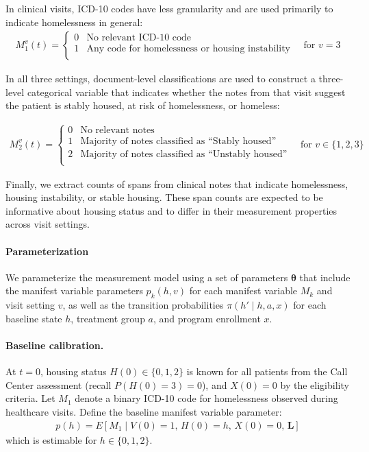 In clinical visits, ICD-10 codes have less granularity and are used primarily to indicate homelessness in general:
\begin{align*}
    M_1^v(t) = \begin{cases}
        0 & \text{No relevant ICD-10 code} \\
        1 & \text{Any code for homelessness or housing instability} \\
    \end{cases} \quad \text{for } v=3 
\end{align*}

In all three settings, document-level classifications are used to construct a three-level categorical variable that indicates whether the notes from that visit suggest the patient is stably housed, at risk of homelessness, or homeless:

\begin{align*}
    M_2^v(t) = \begin{cases}
        0 & \text{No relevant notes} \\
        1 & \text{Majority of notes classified as ``Stably housed''} \\
        2 & \text{Majority of notes classified as ``Unstably housed''} \\
    \end{cases} \quad \text{for } v \in \{1, 2, 3\}
\end{align*}

Finally, we extract counts of spans from clinical notes that indicate homelessness, housing instability, or stable housing. These span counts are expected to be informative about housing status and to differ in their measurement properties across visit settings. 

\paragraph{Parameterization} We parameterize the measurement model using a set of parameters $\boldsymbol{\theta}$ that include the manifest variable parameters $p_k(h, v)$ for each manifest variable $M_k$ and visit setting $v$, as well as the transition probabilities $\pi(h' \mid h, a, x)$ for each baseline state $h$, treatment group $a$, and program enrollment $x$. 



\paragraph{Baseline calibration.} At $t=0$, housing status $H(0) \in \{0, 1, 2\}$ is known for all patients from the Call Center assessment (recall $P(H(0)=3)=0$), and $X(0)=0$ by the eligibility criteria. Let $M_1$ denote a binary ICD-10 code for homelessness observed during healthcare visits. Define the baseline manifest variable parameter:
\begin{align*}
    p(h) = E[M_1 \mid V(0)=1,\, H(0)=h,\, X(0)=0,\, \boldsymbol{L}]
\end{align*}
which is estimable for $h \in \{0, 1, 2\}$.

